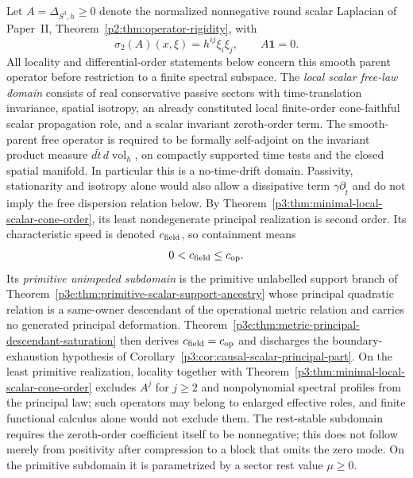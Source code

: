 \documentclass[12pt,a4paper]{article}
\begin{document}
\begin{definition}
\label{p3:def:paper-iv-finite-field-input}
Let \(A=\Delta_{S^3,h}\ge0\) denote the normalized nonnegative round scalar
Laplacian of
Paper~II, Theorem~\ref{p2:thm:operator-rigidity}, with
\[
\sigma_2(A)(x,\xi)=h^{ij}\xi_i\xi_j,
\qquad A\mathbf1=0.
\]
All locality and differential-order statements below concern this smooth
parent operator before restriction to a finite spectral subspace.  The
\emph{local scalar free-law domain}
 consists of real conservative passive sectors with time-translation invariance,
spatial isotropy, an already constituted local finite-order cone-faithful
scalar propagation role, and a scalar invariant zeroth-order term. The
smooth-parent free operator is required to be formally self-adjoint on the
invariant product measure
$d\widetilde t\,d\operatorname{vol}_h$, on compactly supported time tests
and the closed spatial manifold. In particular this is a no-time-drift
domain. Passivity, stationarity and isotropy alone would also allow a
dissipative term $\gamma\partial_{\widetilde t}$ and do not imply the
free dispersion relation below. By
Theorem~\ref{p3:thm:minimal-local-scalar-cone-order}, its least nondegenerate
principal realization is second order.  Its
characteristic speed is denoted \(c_{\rm field}\), so containment means
\[
        0<c_{\rm field}\le c_{\rm op}.
\]
Its \emph{primitive unimpeded subdomain} is the primitive unlabelled support
branch of Theorem~\ref{p3e:thm:primitive-scalar-support-ancestry} whose
principal quadratic relation is a same-owner descendant of the operational
metric relation and carries no generated principal deformation.  Theorem~\ref{p3e:thm:metric-principal-descendant-saturation}
then derives
\(c_{\rm field}=c_{\rm op}\) and discharges the boundary-exhaustion
hypothesis of Corollary~\ref{p3:cor:causal-scalar-principal-part}.  On the least primitive realization, locality together with
Theorem~\ref{p3:thm:minimal-local-scalar-cone-order} excludes \(A^j\) for
\(j\ge2\) and nonpolynomial spectral profiles from the principal law; such
operators may belong to enlarged effective roles, and finite functional
calculus alone would not exclude them.  The rest-stable subdomain requires the
zeroth-order coefficient itself to be nonnegative; this does not follow
merely from positivity after compression to a block that omits the zero mode.
On the primitive subdomain it is parametrized by a sector rest value
\(\mu\ge0\).
\end{definition}
\end{document}
